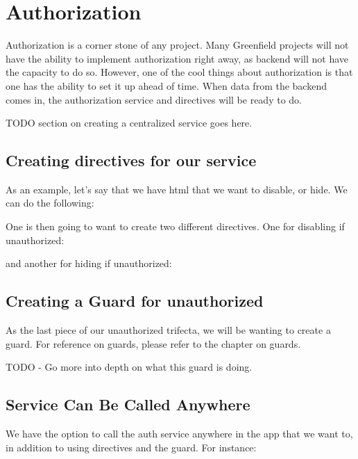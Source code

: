 
\section{ Authorization }

Authorization is a corner stone of any project. Many Greenfield projects will
not have the ability to implement authorization right away, as backend will not
have the capacity to do so. However, one of the cool things about authorization
is that one has the ability to set it up ahead of time. When data from the
backend comes in, the authorization service and directives will be ready to do.

TODO section on creating a centralized service goes here.

\subsection{Creating directives for our service}
As an example, let's say that we have html that we want to disable, or hide. We
can do the following:


One is then going to want to create two different directives. One for disabling
if unauthorized:

and another for hiding if unauthorized:


\subsection{Creating a Guard for unauthorized}
As the last piece of our unauthorized trifecta, we will be wanting to create a
guard. For reference on guards, please refer to the chapter on guards.

TODO - Go more into depth on what this guard is doing.


\subsection{Service Can Be Called Anywhere}
We have the option to call the auth service anywhere in the app that we want to,
in addition to using directives and the guard. For instance:


